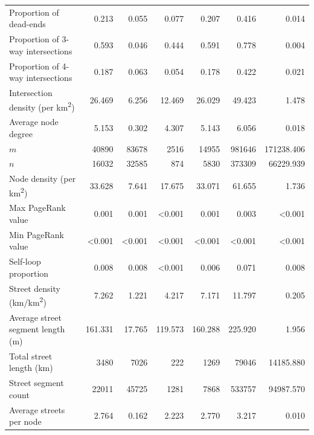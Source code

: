 \documentclass[11pt]{article}
\begin{document}
\begin{multicols}{2}
\begin{table}[htbp]
\begin{tabular}{ l r r r r r r }
	Proportion of dead-ends                          & 0.213          & 0.055          & 0.077          & 0.207          & 0.416          & 0.014          \\
	Proportion of 3-way intersections                & 0.593          & 0.046          & 0.444          & 0.591          & 0.778          & 0.004          \\
	Proportion of 4-way intersections                & 0.187          & 0.063          & 0.054          & 0.178          & 0.422          & 0.021          \\
	Intersection density (per km\textsuperscript{2}) & 26.469         & 6.256          & 12.469         & 26.029         & 49.423         & 1.478          \\
	Average node degree                              & 5.153          & 0.302          & 4.307          & 5.143          & 6.056          & 0.018          \\
	$m$                                              & 40890          & 83678          & 2516           & 14955          & 981646         & 171238.406     \\
	$n$                                              & 16032          & 32585          & 874            & 5830           & 373309         & 66229.939      \\
	Node density (per km\textsuperscript{2})         & 33.628         & 7.641          & 17.675         & 33.071         & 61.655         & 1.736          \\
	Max PageRank value                               & 0.001          & 0.001          & \textless0.001 & 0.001          & 0.003          & \textless0.001 \\
	Min PageRank value                               & \textless0.001 & \textless0.001 & \textless0.001 & \textless0.001 & \textless0.001 & \textless0.001 \\
	Self-loop proportion                             & 0.008          & 0.008          & \textless0.001 & 0.006          & 0.071          & 0.008          \\
	Street density (km/km\textsuperscript{2})        & 7.262          & 1.221          & 4.217          & 7.171          & 11.797         & 0.205          \\
	Average street segment length (m)                & 161.331        & 17.765         & 119.573        & 160.288        & 225.920        & 1.956          \\
	Total street length (km)                         & 3480           & 7026           & 222            & 1269           & 79046          & 14185.880      \\
	Street segment count                             & 22011          & 45725          & 1281           & 7868           & 533757         & 94987.570      \\
	Average streets per node                         & 2.764          & 0.162          & 2.223          & 2.770          & 3.217          & 0.010          \\
	\bottomrule
\end{tabular}
\end{table}


\end{multicols}
\end{document}

